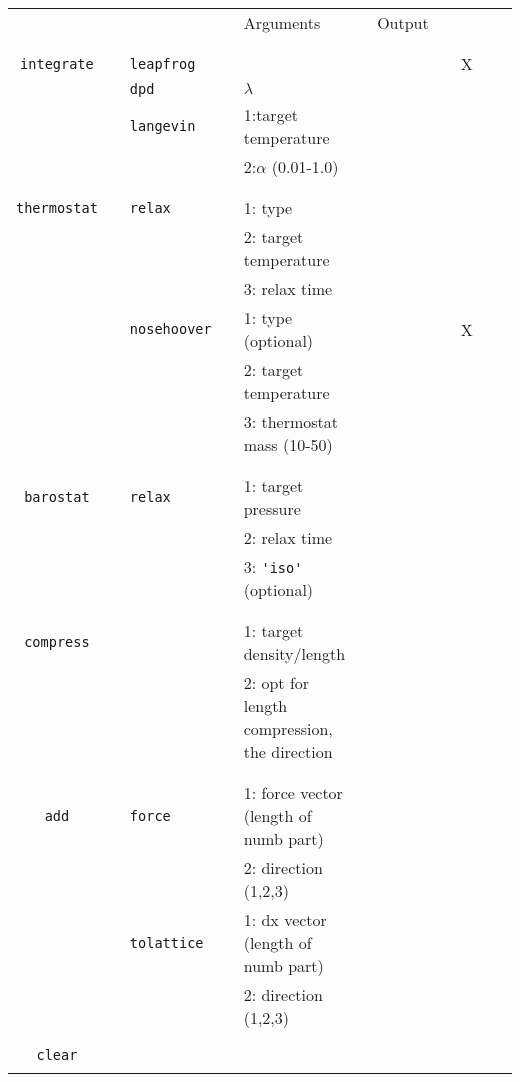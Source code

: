 \documentclass[11pt]{article}
\begin{document}
\clearpage
\begin{center}
  
  \begin{tabular}{cclclclllcc}
	  {\color{red}{\textbf{Action}}} && {\color{blue}{Specifier}} && Arguments && Output && \rotatebox{90}{CUDA}\\
								   && && && && \\
    \hline
								   && && && && \\
	  \verb!integrate! && \verb!leapfrog! && && && X \\
	  $\mbox{}$ && \verb!dpd!      && $\lambda$ && && \\
	  $\mbox{}$ && \verb!langevin! && 1:target temperature && && \\ 
	  $\mbox{}$ &&                 && 2:$\alpha$ (0.01-1.0)&& &&\\
								   && && && && \\
    \hline
								   && && && && \\
	  \verb!thermostat! && \verb!relax! && 1: type && && \\
		$\mbox{}$  &&       && 2: target temperature && && \\
		$\mbox{}$  &&        && 3: relax time && && \\
	  $\mbox{}$  && \verb!nosehoover! && 1: type (optional) && && X\\
	  $\mbox{}$  &&            && 2: target temperature && && \\
	  $\mbox{}$  &&            && 3: thermostat mass (10-50)&& && \\
								   && && && && \\
    \hline
								   && && && && \\
	  \verb!barostat! && \verb!relax! && 1: target pressure && && \\
	  $\mbox{}$   &&       && 2: relax time && && \\
	  $\mbox{}$  &&        && 3: \verb!'iso'! (optional) && && \\
								   && && && && \\
    \hline
								   && && && && \\
	  \verb!compress! && && 1: target density/length && && \\
	  $\mbox{}$ &&       && 2: opt for length compression, the direction && \\
								   && && && && \\
    \hline
								   && && && && \\
	  \verb!add! && \verb!force! && 1: force vector (length of numb part) && && \\
	  $\mbox{}$   &&             && 2: direction (1,2,3) && &&\\
	  $\mbox{}$   && \verb!tolattice! && 1: dx vector (length of numb part) && && \\
	  $\mbox{}$   &&             && 2: direction (1,2,3) && && \\
								   && && && && \\
    \hline
								   && && && && \\
	  \verb!clear! & & && && &&  \\
								   && && && && \\
    \hline
 

\end{tabular}
\end{center}
\end{document}
